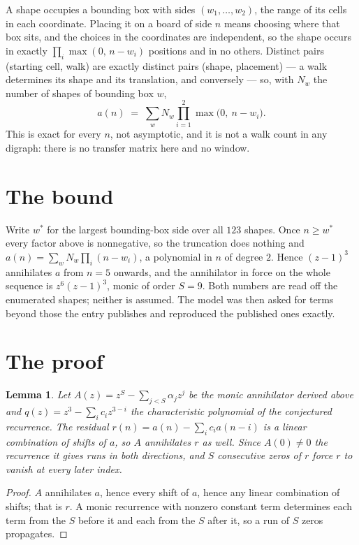 \documentclass[11pt,a4paper]{article}
\theoremstyle{plain}
\newtheorem{lemma}[theorem]{Lemma}
\theoremstyle{definition}
\begin{document}
A shape occupies a bounding box with sides $(w_1,\dots,w_{2})$, the range of its cells in each
coordinate. Placing it on a board of side $n$ means choosing where that box sits, and the
choices in the coordinates are independent, so the shape occurs in exactly
$\prod_{i}\max(0,\,n-w_i)$ positions and in no others. Distinct pairs (starting cell,
walk) are exactly distinct pairs (shape, placement) --- a walk determines its shape and its
translation, and conversely --- so, with $N_w$ the number of shapes of bounding box $w$,
\[
a(n)\;=\;\sum_{w} N_w \prod_{i=1}^{2}\max\bigl(0,\ n-w_i\bigr).
\]
This is exact for every $n$, not asymptotic, and it is not a walk count in any digraph: there is
no transfer matrix here and no window.

\section{The bound}

Write $w^\ast$ for the largest bounding-box side over all $123$ shapes. Once $n\ge w^\ast$
every factor above is nonnegative, so the truncation does nothing and
$a(n)=\sum_w N_w\prod_i(n-w_i)$, a polynomial in $n$ of degree $2$. Hence $(z-1)^{3}$
annihilates $a$ from $n=5$ onwards, and the annihilator in force on the whole sequence is
$z^{6}(z-1)^{3}$, monic of order $S=9$. Both numbers are read off the enumerated
shapes; neither is assumed. The model was then asked for terms beyond those the entry publishes
and reproduced the published ones exactly.

\section{The proof}

\begin{lemma}\label{lem:crit}
Let $A(z)=z^S-\sum_{j<S}\alpha_jz^{j}$ be the monic annihilator derived above and
$q(z)=z^{3}-\sum_ic_iz^{3-i}$ the characteristic polynomial of the conjectured
recurrence. The residual $r(n)=a(n)-\sum_ic_ia(n-i)$ is a linear combination of shifts of $a$,
so $A$ annihilates $r$ as well. Since $A(0)\ne0$ the recurrence it gives runs in both
directions, and $S$ consecutive zeros of $r$ force $r$ to vanish at every later index.
\end{lemma}

\begin{proof}
$A$ annihilates $a$, hence every shift of $a$, hence any linear combination of shifts; that is
$r$. A monic recurrence with nonzero constant term determines each term from the $S$ before it
and each from the $S$ after it, so a run of $S$ zeros propagates.
\end{proof}
\end{document}
